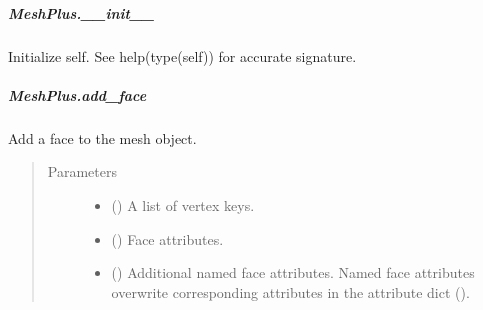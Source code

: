 \documentclass[letterpaper,10pt,english]{sphinxmanual}
\begin{document}
\begin{fulllineitems}
\subparagraph{MeshPlus.\_\_init\_\_}
\label{\detokenize{api/generated/directional_clustering.mesh.MeshPlus.__init__:meshplus-init}}\label{\detokenize{api/generated/directional_clustering.mesh.MeshPlus.__init__::doc}}

\begin{fulllineitems}
\label{\detokenize{api/generated/directional_clustering.mesh.MeshPlus.__init__:directional_clustering.mesh.MeshPlus.__init__}}
Initialize self.  See help(type(self)) for accurate signature.

\end{fulllineitems}



\subparagraph{MeshPlus.add\_face}
\label{\detokenize{api/generated/directional_clustering.mesh.MeshPlus.add_face:meshplus-add-face}}\label{\detokenize{api/generated/directional_clustering.mesh.MeshPlus.add_face::doc}}

\begin{fulllineitems}
\label{\detokenize{api/generated/directional_clustering.mesh.MeshPlus.add_face:directional_clustering.mesh.MeshPlus.add_face}}
Add a face to the mesh object.
\begin{quote}\begin{description}
\item[{Parameters}] \leavevmode\begin{itemize}
\item {} 
 () \textendash{} A list of vertex keys.

\item {} 
 () \textendash{} Face attributes.

\item {} 
 () \textendash{} Additional named face attributes.
Named face attributes overwrite corresponding attributes in the
attribute dict ().


\end{itemize}
\end{description}
\end{quote}
\end{fulllineitems}
\end{fulllineitems}
\end{document}
